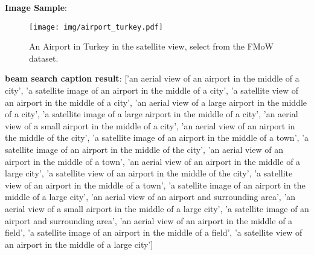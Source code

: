 \documentclass[journal]{IEEEtran}
\begin{document}
\textbf{Image Sample}: 

\begin{figure}[H]
    \centering
    \texttt{[image: img/airport\_turkey.pdf]}
    \caption{An Airport in Turkey in the satellite view, select from the FMoW dataset.}
    \label{fig:airport_turkey}
\end{figure}


\textbf{beam search caption result}: ['an aerial view of an airport in the middle of a city', 'a satellite image of an airport in the middle of a city', 'a satellite view of an airport in the middle of a city', 'an aerial view of a large airport in the middle of a city', 'a satellite image of a large airport in the middle of a city', 'an aerial view of a small airport in the middle of a city', 'an aerial view of an airport in the middle of the city', 'a satellite image of an airport in the middle of a town', 'a satellite image of an airport in the middle of the city', 'an aerial view of an airport in the middle of a town', 'an aerial view of an airport in the middle of a large city', 'a satellite view of an airport in the middle of the city', 'a satellite view of an airport in the middle of a town', 'a satellite image of an airport in the middle of a large city', 'an aerial view of an airport and surrounding area', 'an aerial view of a small airport in the middle of a large city', 'a satellite image of an airport and surrounding area', 'an aerial view of an airport in the middle of a field', 'a satellite image of an airport in the middle of a field', 'a satellite view of an airport in the middle of a large city']
\end{document}

